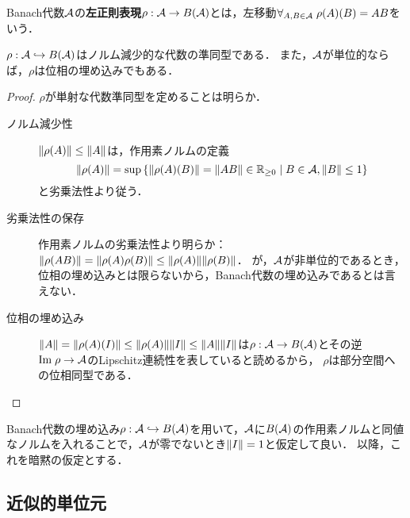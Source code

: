 \documentclass[uplatex,dvipdfmx]{jsreport}
\begin{document}
\begin{definition}
    Banach代数$\mathcal{A}$の\textbf{左正則表現}$\rho:\mathcal{A}\to B(\mathcal{A})$とは，左移動$\forall_{A,B\in\mathcal{A}}\;\rho(A)(B)=AB$をいう．
\end{definition}
\begin{lemma}
    $\rho:\mathcal{A}\hookrightarrow B(\mathcal{A})$はノルム減少的な代数の準同型である．
    また，$\mathcal{A}$が単位的ならば，$\rho$は位相の埋め込みでもある．
\end{lemma}
\begin{proof}
    $\rho$が単射な代数準同型を定めることは明らか．
    \begin{description}
        \item[ノルム減少性] $\|\rho(A)\|\le\|A\|$は，作用素ノルムの定義
        \[\|\rho(A)\|=\sup\left\{\|\rho(A)(B)\|=\|AB\|\in\mathbb{R}_{\ge0}\mid B\in\mathcal{A},\|B\|\le 1\right\}\]
        と劣乗法性より従う．
        \item[劣乗法性の保存] 作用素ノルムの劣乗法性より明らか：$\|\rho(AB)\|=\|\rho(A)\rho(B)\|\le\|\rho(A)\|\|\rho(B)\|$．
        が，$\mathcal{A}$が非単位的であるとき，位相の埋め込みとは限らないから，Banach代数の埋め込みであるとは言えない．
        \item[位相の埋め込み] 
        $\|A\|=\|\rho(A)(I)\|\le\|\rho(A)\|\|I\|\le\|A\|\|I\|$は$\rho:\mathcal{A}\to B(\mathcal{A})$とその逆$\mathrm{Im}\;\rho\to\mathcal{A}$のLipschitz連続性を表していると読めるから，
        $\rho$は部分空間への位相同型である．
    \end{description}
\end{proof}
\begin{remark}
    Banach代数の埋め込み$\rho:\mathcal{A}\hookrightarrow B(\mathcal{A})$を用いて，$\mathcal{A}$に$B(\mathcal{A})$の作用素ノルムと同値なノルムを入れることで，$\mathcal{A}$が零でないとき$\|I\|=1$と仮定して良い．
    以降，これを暗黙の仮定とする．
\end{remark}

\subsection{近似的単位元}
\end{document}
